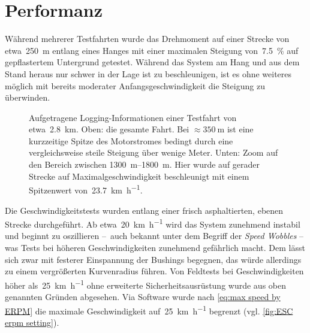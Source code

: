 	\section{Performanz}
		Während mehrerer Testfahrten wurde das Drehmoment auf einer Strecke von etwa~\qty{250}{\metre} entlang eines Hanges mit einer maximalen Steigung von~\qty{7,5}{\percent} auf gepflastertem Untergrund getestet.
		Während das System am Hang und aus dem Stand heraus nur schwer in der Lage ist zu beschleunigen, ist es ohne weiteres möglich mit bereits moderater Anfangsgeschwindigkeit die Steigung zu überwinden.
		\begin{figure}[h]
			\centering
			
			\caption[Aufgetragene Logging-Informationen einer Testfahrt]{Aufgetragene Logging-Informationen einer Testfahrt von etwa~\qty{2,8}{\kilo\metre}. Oben: die gesamte Fahrt. Bei \(\approx \qty{350}{\metre}\) ist eine kurzzeitige Spitze des Motorstromes bedingt durch eine vergleichsweise steile Steigung über wenige Meter. Unten: Zoom auf den Bereich zwischen \qtyrange{1300}{1800}{\metre}. Hier wurde auf gerader Strecke auf Maximalgeschwindigkeit beschleunigt mit einem Spitzenwert von~\qty{23,7}{\kilo\metre\per\hour}.}%
			\label{fig:esc testdrive plot}
		\end{figure}
		Die Geschwindigkeitstests wurden entlang einer frisch asphaltierten, ebenen Strecke durchgeführt.
		Ab etwa~\qty{20}{\kilo\metre\per\hour} wird das System zunehmend instabil und beginnt zu oszillieren --~auch bekannt unter dem Begriff der \textit{Speed Wobbles} -- was Tests bei höheren Geschwindigkeiten zunehmend gefährlich macht.
		Dem lässt sich zwar mit festerer Einspannung der Bushings begegnen, das würde allerdings zu einem vergrößerten Kurvenradius führen.
		Von Feldtests bei Geschwindigkeiten höher als~\qty{25}{\kilo\metre\per\hour} ohne erweiterte Sicherheitsausrüstung wurde aus oben genannten Gründen abgesehen.
		Via Software wurde nach \cref{eq:max speed by ERPM} die maximale Geschwindigkeit auf~\qty{25}{\kilo\metre\per\hour} begrenzt (vgl. \cref{fig:ESC erpm setting}).
		
